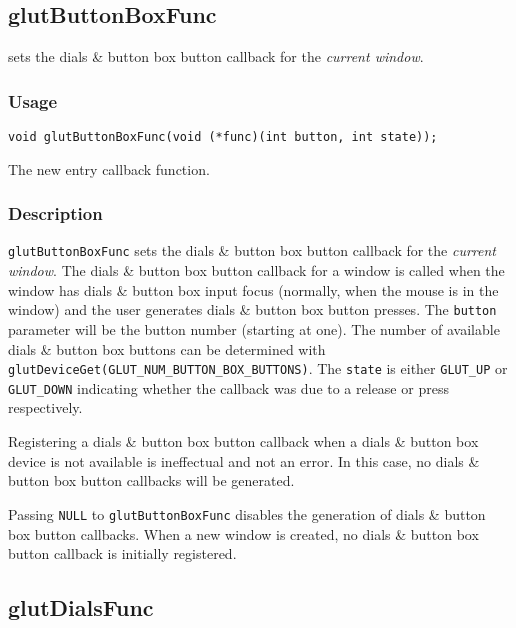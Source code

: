 \subsection{glutButtonBoxFunc}

 sets the dials \& button box button callback for
the {\em current window}.

\subsubsection*{Usage}
\begin{verbatim}
void glutButtonBoxFunc(void (*func)(int button, int state));
\end{verbatim}
\begin{description}
\itemsep 0in
\item[\tt func]
The new entry callback function.
\end{description}

\subsubsection*{Description}

{\tt glutButtonBoxFunc} sets the dials \& button box button callback for the {\em
current window}.  The dials \& button box button callback for a window is called when the
window has dials \& button box input focus (normally, when the mouse is in the window)
and the user generates dials \& button box button presses.  The {\tt button} parameter
will be the button number (starting at one).  The number of available dials \&
button box
buttons can be determined with {\tt glutDeviceGet(GLUT\_NUM\_BUTTON\_BOX\_BUTTONS)}.
The {\tt state} is either {\tt GLUT\_UP} or {\tt GLUT\_DOWN} indicating whether
the callback was due to a release or press respectively.

Registering a dials \& button box button callback when a dials \& button box
device is not available
is ineffectual and not an error.  In this case, no dials \& button box button callbacks
will be generated.

Passing {\tt NULL} to {\tt glutButtonBoxFunc} disables the generation of
dials \& button box button callbacks.  When a new window is created, no
dials \& button box button callback is initially registered.

\subsection{glutDialsFunc}


